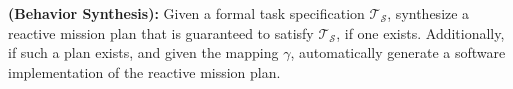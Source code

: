 \begin{myProblem}\label{BehaviorSynthesisProblem}
\textbf{(Behavior Synthesis):}
Given a formal task specification $\mathcal{T}_\mathcal{S}$, synthesize a reactive mission plan that is guaranteed to satisfy $\mathcal{T}_\mathcal{S}$, if one exists.
Additionally, if such a plan exists, and given the mapping $\gamma$, automatically generate a software implementation of the reactive mission plan. 
\end{myProblem}

